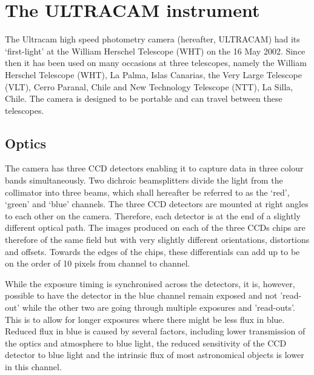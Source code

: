 \section{The ULTRACAM instrument} 

The Ultracam high speed photometry camera (hereafter, ULTRACAM) had its `first-light' at the William Herschel Telescope (WHT) on the 16 May 2002. Since then it has been used on many occasions at three telescopes, namely the William Herschel Telescope (WHT), La Palma, Islas Canarias, the Very Large Telescope (VLT), Cerro Paranal, Chile and New Technology Telescope (NTT), La Silla, Chile. The camera is designed to be portable and can travel between these telescopes. 

\subsection{Optics}

The camera has three CCD detectors enabling it to capture data in three colour bands simultaneously. Two dichroic beamsplitters divide the light from the collimator into three beams, which shall hereafter be referred to as the `red', `green' and `blue' channels. The three CCD detectors are mounted at right angles to each other on the camera. Therefore, each detector is at the end of a slightly different optical path. The images produced on each of the three CCDs chips are therefore of the same field but with very slightly different orientations, distortions and offsets. Towards the edges of the chips, these differentials can add up to be on the order of 10 pixels from channel to channel. 

While the exposure timing is synchronised across the detectors, it is, however, possible to have the detector in the blue channel remain exposed and not 'read-out' while the other two are going through multiple exposures and 'read-outs'. This is to allow for longer exposures where there might be less flux in blue. Reduced flux in blue is caused by several factors, including lower transmission of the optics and atmosphere to blue light, the reduced sensitivity of the CCD detector to blue light and the intrinsic flux of most astronomical objects is lower in this channel.

